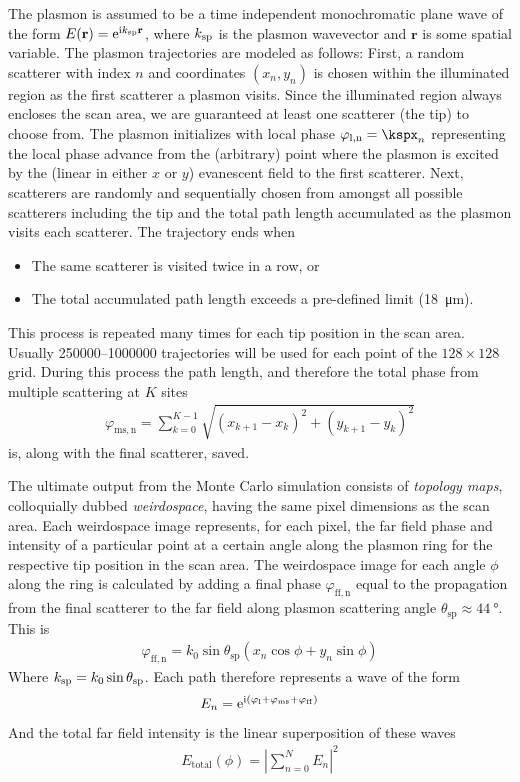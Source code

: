The plasmon is assumed to be a time independent monochromatic plane wave
of the form $E(\mathbf{r})={\mathrm{e}}^{{\mathrm{i}} k_\mathrm{sp}\mathbf{r}}$, where
$k_\mathrm{sp}$ is the plasmon wavevector and $\mathbf{r}$ is some
spatial variable.  The plasmon trajectories are modeled as follows:
First, a random scatterer with index $n$ and coordinates $(x_n,y_n)$ is
chosen within the illuminated region as the first scatterer a plasmon
visits.  Since the illuminated region always encloses the scan area, we are
guaranteed at least one scatterer (the tip) to choose from.  The plasmon
initializes with local phase $\varphi_\mathrm{l,n}=\kspx_n$
representing the local phase advance from the (arbitrary) point where the
plasmon is excited by the (linear in either $x$ or $y$) evanescent field to
the first scatterer.  Next, scatterers are randomly and sequentially chosen
from amongst all possible scatterers including the tip and the total path
length accumulated as the plasmon visits each scatterer.  The trajectory
ends when
\begin{itemize}
\item The same scatterer is visited twice in a row, or
\item The total accumulated path length exceeds a pre-defined limit
(\SI{18}{\micro\meter}).  
\end{itemize}
This process is repeated many times for each tip position in the scan area.
Usually \numrange{250000}{1000000} trajectories will be used for each point
of the $128\times128$ grid.  During this process the path length, and
therefore the total phase from multiple scattering at $K$ sites
\begin{align}
\varphi_\mathrm{ms,n}=\sum_{k=0}^{K-1} \sqrt{(x_{k+1}-x_k)^2+(y_{k+1}-y_k)^2}
\end{align}
is, along with the final scatterer, saved.

The ultimate output from the Monte Carlo simulation consists of {\it
topology maps}, colloquially dubbed {\it weirdospace}, having the same pixel
dimensions as the scan area.  Each weirdospace image represents, for each
pixel, the far field phase and intensity of a particular point at a certain
angle along the plasmon ring for the respective tip position in the scan
area.  The weirdospace image for each angle $\phi$ along the ring is
calculated by adding a final phase $\varphi_\mathrm{ff,n}$ equal to the
propagation from the final scatterer to the far field along plasmon
scattering angle $\theta_\mathrm{sp}\approx \SI{44}{\degree}$.  This is 
\begin{align}
\varphi_\mathrm{ff,n} = k_0 \sin
\theta_\mathrm{sp}\left(x_n\cos\phi+y_n\sin\phi\right)
\end{align}
Where $k_\mathrm{sp}=k_0\sin \theta_\mathrm{sp}$.  Each path therefore
represents a wave of the form
\begin{align}
E_n={\mathrm{e}}^{{\mathrm{i}}(\varphi_\mathrm{l}+\varphi_\mathrm{ms}+\varphi_\mathrm{ff})}
\end{align}
And the total far field intensity is the linear superposition of these
waves
\begin{align}
E_\mathrm{total}(\phi) = 
\left|\sum_{n=0}^{N} E_n\right|^2
\end{align}

